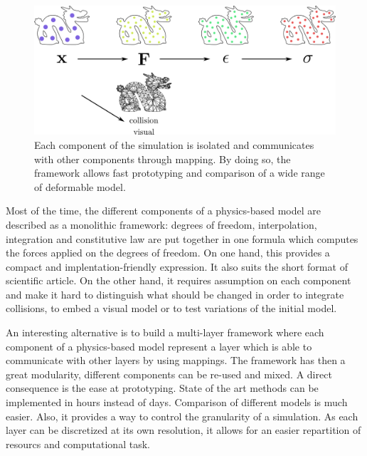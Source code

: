 \begin{figure}[!ht]
\centering
\includegraphics[scale=0.6]{./images/continuum_mechanics/multiLayeredFramework.png}
\caption[STAR mechanics: Multi-layer framework]{\label{fig:multiLayerFramework} Each component of the simulation is isolated and communicates with other components through mapping. By doing so, the framework allows fast prototyping and comparison of a wide range of deformable model.}
\end{figure}

Most of the time, the different components of a physics-based model are described as a monolithic framework: degrees of freedom, interpolation, integration and constitutive law are put together in one formula which computes the forces applied on the degrees of freedom. On one hand, this provides a compact and implentation-friendly expression. It also suits the short format of scientific article. On the other hand, it requires assumption on each component and make it hard to distinguish what should be changed in order to integrate collisions, to embed a visual model or to test variations of the initial model.

An interesting alternative is to build a multi-layer framework where each component of a physics-based model represent a layer which is able to communicate with other layers by using mappings. The framework has then a great modularity, different components can be re-used and mixed. A direct consequence is the ease at prototyping. State of the art methods can be implemented in hours instead of days. Comparison of different models is much easier. Also, it provides a way to control the granularity of a simulation. As each layer can be discretized at its own resolution, it allows for an easier repartition of resourcs and computational task.

